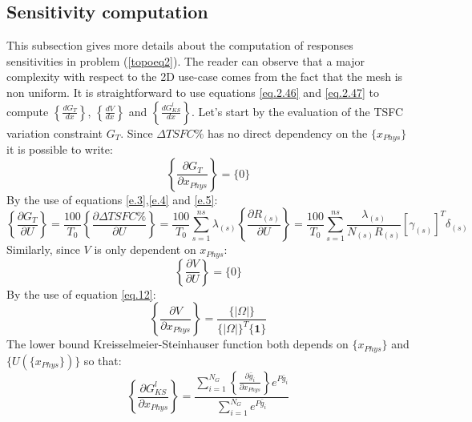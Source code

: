  \subsection{Sensitivity computation}
 \label{subsec2.4}
 This subsection gives more details about the computation of responses sensitivities in problem (\ref{topoeq2}). The reader can observe that a major complexity with respect to the 2D use-case comes from the fact that the mesh is non uniform.
  It is straightforward to use equations \eqref{eq.2.46} and \eqref{eq.2.47} to compute $\left\lbrace\frac{d G_T}{dx}\right\rbrace$, $\left\lbrace\frac{d V}{dx}\right\rbrace$ and $\left\lbrace\frac{d G_{KS}^l}{dx}\right\rbrace$. Let's start by the evaluation of the TSFC variation constraint $G_T$. Since $ \Delta TSFC \%$ has no direct dependency on the $\lbrace x_{Phys}\rbrace$ it is possible to write:
    \begin{equation}
   \left \lbrace\frac{\partial G_T}{\partial x_{Phys}}\right \rbrace=\lbrace 0\rbrace 
    \end{equation}
     By the use of equations \ref{e.3},\ref{e.4} and \ref{e.5}:
    \begin{equation}
      \left \lbrace\frac{\partial G_T}{\partial U}\right \rbrace=\frac{100 }{T_0}\left \lbrace\frac{\partial \Delta TSFC \%}{\partial U}\right \rbrace =\frac{100 }{T_0}\sum_{s=1}^{ns}\lambda_{(s)}\left \lbrace\frac{\partial R_{(s)}}{\partial U}\right \rbrace=\frac{100}{T_0}\sum_{s=1}^{ns}\frac{\lambda_{(s)}}{N_{(s)}R_{(s)}}\left[\gamma_{(s)}\right] ^T\delta_{(s)}
       \end{equation}
       Similarly, since $V$ is only dependent on $x_{Phys}$:
 \begin{equation}
           \left\lbrace\frac{\partial V}{\partial U}\right\rbrace=\lbrace 0\rbrace 
 \end{equation}
 By the use of equation \eqref{eq.12}:
    \begin{equation}
                     \left\lbrace\frac{\partial V}{\partial x_{Phys}}\right\rbrace=\frac{\lbrace|\Omega|\rbrace}{\lbrace|\Omega|\rbrace^T\lbrace \mathbf{1}\rbrace}
     \end{equation}
 The lower bound Kreisselmeier-Steinhauser
 function both depends on $\lbrace x_{Phys}\rbrace$ and $\lbrace U (\lbrace x_{Phys}\rbrace) \rbrace$ so that: 
   \begin{equation}
   \left\lbrace\frac{\partial G^{l}_{KS}}{\partial x_{Phys}}\right\rbrace=\frac{\sum_{i=1}^{N_G}\left\lbrace\frac{\partial \bar{g}_i}{\partial x_{Phys}}\right \rbrace e^{P\bar{g}_i}}{\sum_{i=1}^{N_G}e^{P\bar{g}_i}}
   \end{equation}
